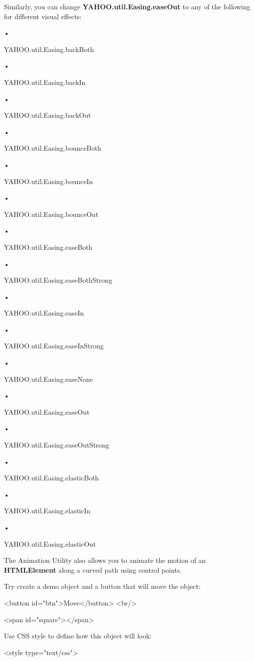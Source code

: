 \documentclass[
]{article}
\begin{document}
Similarly, you can change \textbf{YAHOO.util.Easing.easeOut} to any of
the following for different visual effects:

•

YAHOO.util.Easing.backBoth

•

YAHOO.util.Easing.backIn

•

YAHOO.util.Easing.backOut

•

YAHOO.util.Easing.bounceBoth

•

YAHOO.util.Easing.bounceIn

•

YAHOO.util.Easing.bounceOut

•

YAHOO.util.Easing.easeBoth

•

YAHOO.util.Easing.easeBothStrong

•

YAHOO.util.Easing.easeIn

•

YAHOO.util.Easing.easeInStrong

•

YAHOO.util.Easing.easeNone

•

YAHOO.util.Easing.easeOut

•

YAHOO.util.Easing.easeOutStrong

•

YAHOO.util.Easing.elasticBoth

•

YAHOO.util.Easing.elasticIn

•

YAHOO.util.Easing.elasticOut

The Animation Utility also allows you to animate the motion of an
\textbf{HTMLElement} along a curved path using control points.

Try create a demo object and a button that will move the object:

\textless button id="btn"\textgreater Move\textless/button\textgreater{}
\textless br/\textgreater{}

\textless span id="square"\textgreater\textless/span\textgreater{}

Use CSS style to define how this object will look:

\textless style type="text/css"\textgreater{}
\end{document}
